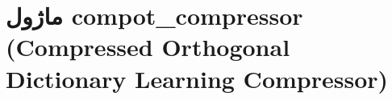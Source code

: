 \section{ماژول compot\_compressor (Compressed Orthogonal Dictionary Learning Compressor)}
\label{sec:module_compot_compressor}
